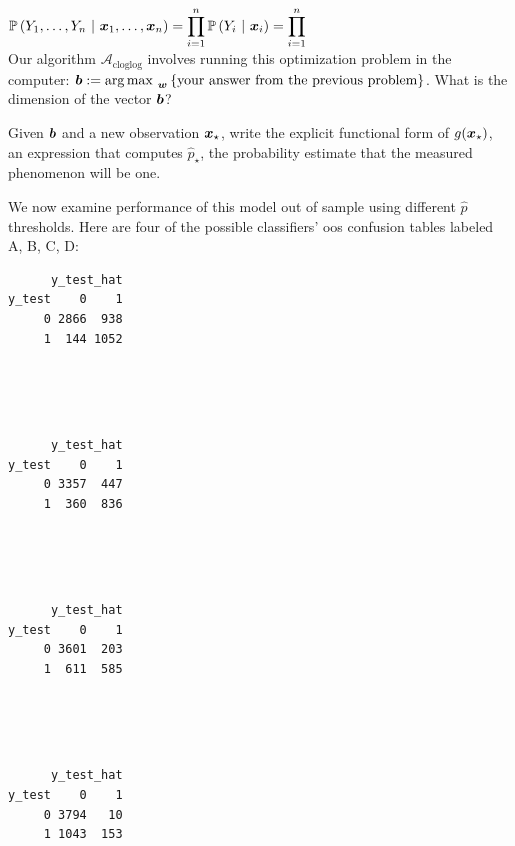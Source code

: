 \documentclass[12pt]{article}
\begin{document}
$\mathbb{P}\left(Y_1, \ldots, Y_n~|~\boldsymbol{x}_1, \ldots, \boldsymbol{x}_n\right) = \displaystyle\prod_{i=1}^n \mathbb{P}\left(Y_i~|~\boldsymbol{x}_i\right) =\prod_{i=1}^n  $\\

 Our algorithm $\mathcal{A}_{\text{cloglog}}$ involves running this optimization problem in the computer: $\boldsymbol{b} := \operatorname*{arg\,max~}_{\boldsymbol{w}} \left\{\text{your answer from the previous problem}\right\}$. What is the dimension of the vector $\boldsymbol{b}$?

 Given $\boldsymbol{b}$ and a new observation $\boldsymbol{x}_\star$, write the explicit functional form of $g(\boldsymbol{x}_\star)$, an expression that computes $\hat{p}_\star$, the probability estimate that the measured phenomenon will be one. 


We now examine performance of this model out of sample using different $\hat{p}$ thresholds. Here are four of the possible classifiers' oos confusion tables labeled A, B, C, D:


\begin{multicols}{4}
\setlength{\columnseprule}{0.4pt}
\begin{center}\end{center}
\begin{verbatim}
      y_test_hat
y_test    0    1
     0 2866  938
     1  144 1052
\end{verbatim}
~\\~\\~\\
\columnbreak
\begin{center}\end{center}
\begin{verbatim}
      y_test_hat
y_test    0    1
     0 3357  447
     1  360  836
\end{verbatim}
~\\~\\~\\
\columnbreak
\begin{center}\end{center}
\begin{verbatim}
      y_test_hat
y_test    0    1
     0 3601  203
     1  611  585
\end{verbatim}
~\\~\\~\\
\columnbreak
\begin{center}\end{center}
\begin{verbatim}
      y_test_hat
y_test    0    1
     0 3794   10
     1 1043  153
\end{verbatim}
~\\~\\~\\
\end{multicols}
\pagebreak
\end{document}
